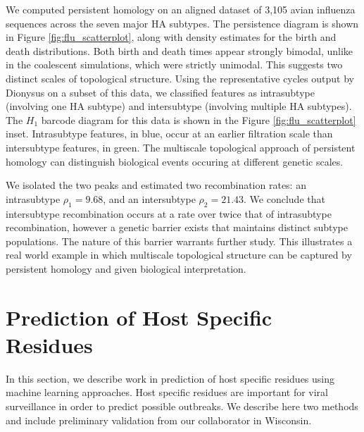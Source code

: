 We computed persistent homology on an aligned dataset of 3,105 avian influenza sequences across the seven major HA subtypes.
The persistence diagram is shown in Figure \ref{fig:flu_scatterplot}, along with density estimates for the birth and death distributions.
Both birth and death times appear strongly bimodal, unlike in the coalescent simulations, which were strictly unimodal.
This suggests two distinct scales of topological structure.
Using the representative cycles output by Dionysus on a subset of this data, we classified features as intrasubtype (involving one HA subtype) and intersubtype (involving multiple HA subtypes).
The $H_1$ barcode diagram for this data is shown in the Figure \ref{fig:flu_scatterplot} inset.
Intrasubtype features, in blue, occur at an earlier filtration scale than intersubtype features, in green.
The multiscale topological approach of persistent homology can distinguish biological events occuring at different genetic scales.

We isolated the two peaks and estimated two recombination rates: an intrasubtype $\rho_{1}=9.68$, and an intersubtype $\rho_{2}=21.43$.
We conclude that intersubtype recombination occurs at a rate over twice that of intrasubtype recombination, however a genetic barrier exists that maintains distinct subtype populations.
The nature of this barrier warrants further study.
This illustrates a real world example in which multiscale topological structure can be captured by persistent homology and given biological interpretation.

\section{Prediction of Host Specific Residues}

In this section, we describe work in prediction of host specific residues using machine learning approaches.
Host specific residues are important for viral surveillance in order to predict possible outbreaks.
We describe here two methods and include preliminary validation from our collaborator in Wisconsin.